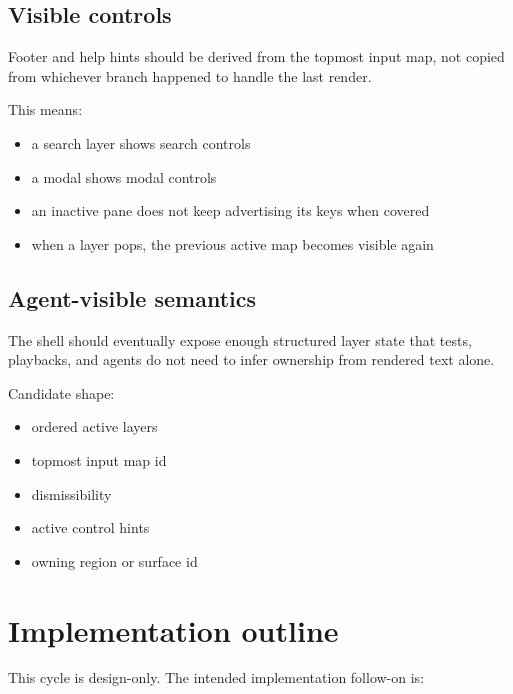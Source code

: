 \subsection{Visible controls}\label{record-254-visible-controls}

Footer and help hints should be derived from the topmost input map, not copied from whichever branch happened to handle the last render.

This means:

\begin{itemize}
\tightlist
\item
  a search layer shows search controls
\item
  a modal shows modal controls
\item
  an inactive pane does not keep advertising its keys when covered
\item
  when a layer pops, the previous active map becomes visible again
\end{itemize}

\subsection{Agent-visible semantics}\label{record-254-agent-visible-semantics}

The shell should eventually expose enough structured layer state that tests, playbacks, and agents do not need to infer ownership from rendered text alone.

Candidate shape:

\begin{itemize}
\tightlist
\item
  ordered active layers
\item
  topmost input map id
\item
  dismissibility
\item
  active control hints
\item
  owning region or surface id
\end{itemize}

\section{Implementation outline}\label{record-254-implementation-outline}

This cycle is design-only. The intended implementation follow-on is:

